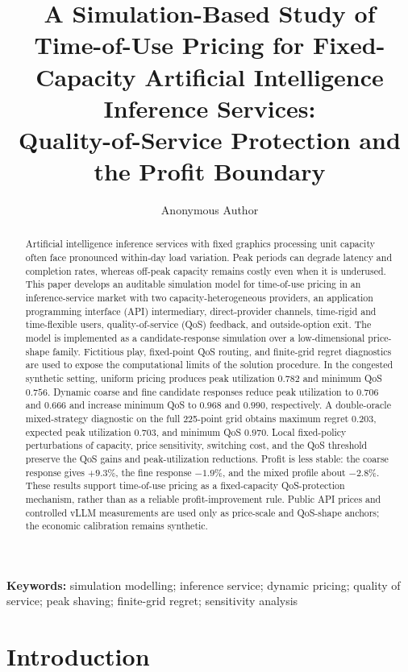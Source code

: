 \documentclass[11pt,a4paper]{article}
\title{\textbf{A Simulation-Based Study of Time-of-Use Pricing for Fixed-Capacity Artificial Intelligence Inference Services:\\
Quality-of-Service Protection and the Profit Boundary}}
\author{Anonymous Author}
\date{}
\begin{document}
\maketitle

\begin{abstract}
Artificial intelligence inference services with fixed graphics processing unit capacity often face pronounced within-day load variation. Peak periods can degrade latency and completion rates, whereas off-peak capacity remains costly even when it is underused. This paper develops an auditable simulation model for time-of-use pricing in an inference-service market with two capacity-heterogeneous providers, an application programming interface (API) intermediary, direct-provider channels, time-rigid and time-flexible users, quality-of-service (QoS) feedback, and outside-option exit. The model is implemented as a candidate-response simulation over a low-dimensional price-shape family. Fictitious play, fixed-point QoS routing, and finite-grid regret diagnostics are used to expose the computational limits of the solution procedure. In the congested synthetic setting, uniform pricing produces peak utilization $0.782$ and minimum QoS $0.756$. Dynamic coarse and fine candidate responses reduce peak utilization to $0.706$ and $0.666$ and increase minimum QoS to $0.968$ and $0.990$, respectively. A double-oracle mixed-strategy diagnostic on the full 225-point grid obtains maximum regret $0.203$, expected peak utilization $0.703$, and minimum QoS $0.970$. Local fixed-policy perturbations of capacity, price sensitivity, switching cost, and the QoS threshold preserve the QoS gains and peak-utilization reductions. Profit is less stable: the coarse response gives $+9.3\%$, the fine response $-1.9\%$, and the mixed profile about $-2.8\%$. These results support time-of-use pricing as a fixed-capacity QoS-protection mechanism, rather than as a reliable profit-improvement rule. Public API prices and controlled vLLM measurements are used only as price-scale and QoS-shape anchors; the economic calibration remains synthetic.
\end{abstract}

\noindent\textbf{Keywords:} simulation modelling; inference service; dynamic pricing; quality of service; peak shaving; finite-grid regret; sensitivity analysis

\section{Introduction}
\label{sec:intro}
\end{document}
